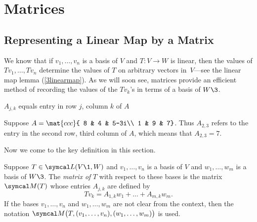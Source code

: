 \section{Matrices} \label{matrices}

\subsection{Representing a Linear Map by a Matrix}

We know that if $v_1, \dots, v_n$ is a basis of $V$ and
$T \colon V \rightarrow W$ is linear, then the values of $Tv_1, \dots, Tv_n$
determine the values of $T$ on arbitrary vectors in~$V$---see the linear map lemma (\ref{3linearmap}). As we will soon see, matrices provide an efficient method of recording the values of the $Tv_k$'s in terms of a basis of $W\3$.


\begin{example}{$A_{j,k}$ equals entry in row\/ $j$, column\/ $k$ of\/ $A$}
\vspace{-5bp} %

Suppose $A = \mat{ccc}{ 8 & 4 & 5-3i\\ 1 & 9 & 7}$. Thus $A_{2,3}$ refers to the entry in the second row,
third column of $A$, which means that $A_{2,3} = 7$.
\end{example}

Now we come to the key definition in this section.

{Suppose $T \in \L(V\1,W)$ and $v_1, \dots, v_n$ is a basis of $V$ and
$w_1, \dots, w_m$ is a basis of $W\3$. The
\emph{matrix of} $T$ with respect to these bases
is the  matrix $\M(T)$ whose entries $A_{j,k}$ are defined by
\[
Tv_k = A_{1,k} w_1 + \dots + A_{m,k} w_m.
\]
If the bases $v_1, \dots, v_n$ and $w_1, \dots, w_m$ are not clear from the context, then the notation
$\M\bigl( T, (v_1, \dots, v_n), (w_1, \dots, w_m) \bigr)$ is used.
}

